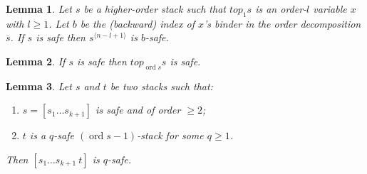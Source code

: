 \documentclass{article}
\newcommand{\ord}{\mathop{\mathrm{ord}}}
\newtheorem{lemma}{Lemma}[section]
\theoremstyle{remark}
\theoremstyle{definition}
\newcommand\orddec\overline
\begin{document}
\begin{lemma}
\label{lem:incrk_qsafe}
 Let $s$ be a higher-order stack such that $top_1 s$ is an order-$l$ variable $x$ with $l\geq 1$. Let $b$ be the (backward) index of $x$'s binder in the order decomposition $\orddec{s}$.
If $s$ is safe then $s^{\langle n-l+1 \rangle}$ is $b$-safe.
\end{lemma}

\begin{lemma}
\label{lem:top_qsafe} If $s$ is safe then $top_{\ord{s}} s$ is safe.
\end{lemma}

\begin{lemma}
\label{lem:cons_qsafety} Let $s$ and $t$ be two stacks such that:
\begin{enumerate}[1.]
\item $s = [s_1 \ldots s_{k+1}]$ is safe and of order $\geq 2$;
\item $t$ is a $q$-safe $(\ord{s}-1)$-stack for some $q\geq1$.
\end{enumerate}
Then $[s_1 \ldots s_{k+1}~ t]$ is $q$-safe.
\end{lemma}
\end{document}
